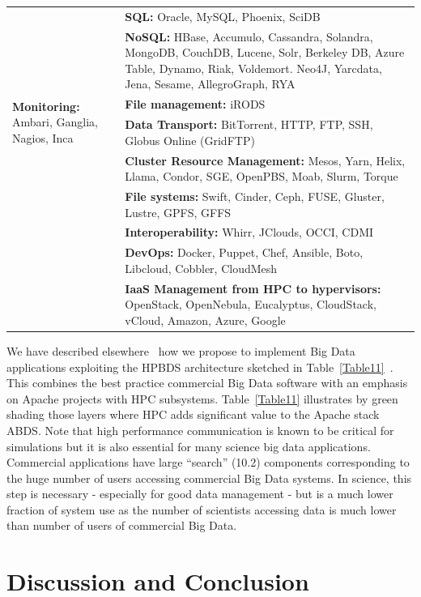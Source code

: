 \documentclass{acm_proc_article-sp}
\begin{document}
\begin{table}[H]
\begin{tabular}{|p{2cm}|p{6cm}|}
&\textbf{SQL:} Oracle, MySQL, Phoenix, SciDB\\ \cline{2-2} 
&\textbf{NoSQL:} HBase, Accumulo, Cassandra, Solandra, MongoDB, CouchDB, Lucene, Solr, Berkeley DB, Azure Table, Dynamo, Riak, Voldemort. Neo4J, Yarcdata, Jena, Sesame, AllegroGraph, RYA\\ \hline
\multirow{2}{2cm}{\textbf{Monitoring:} Ambari, Ganglia, Nagios, Inca}
&\textbf{File management:} iRODS\\ \cline{2-2} 
&\textbf{Data Transport:} BitTorrent, HTTP, FTP, SSH, Globus Online (GridFTP)\\ \cline{2-2} 
&\textbf{Cluster Resource Management:} Mesos, Yarn, Helix, Llama, Condor, SGE, OpenPBS, Moab, Slurm, Torque\\ \cline{2-2} 
&\textbf{File systems:} Swift, Cinder, Ceph, FUSE, Gluster, Lustre, GPFS, GFFS\\ \cline{2-2} 
&\textbf{Interoperability:} Whirr, JClouds, OCCI, CDMI\\ \cline{2-2} 
&\textbf{DevOps:} Docker, Puppet, Chef, Ansible, Boto, Libcloud, Cobbler, CloudMesh\\ \cline{2-2} 
&\textbf{IaaS Management from HPC to hypervisors:} OpenStack, OpenNebula, Eucalyptus, CloudStack, vCloud, Amazon, Azure, Google\\ \hline
\end{tabular}

\end{table}


We have described elsewhere~\cite{b30,b14,b27} how we propose to implement Big
Data applications exploiting the HPBDS architecture sketched in
Table~\ref{Table11}~\cite{b2}. This combines the best practice commercial Big
Data software with an emphasis on Apache projects with HPC subsystems.
Table~\ref{Table11} illustrates by green shading those layers where HPC adds
significant value to the Apache stack ABDS. Note that high performance
communication is known to be critical for simulations but it is also essential
for many science big data applications. Commercial applications have large
``search'' (10.2) components corresponding to the huge number of users
accessing commercial Big Data systems. In science, this step is necessary -
especially for good data management - but is a much lower fraction of system
use as the number of scientists accessing data is much lower than number of
users of commercial Big Data.

\section{Discussion and Conclusion}
\end{document}
